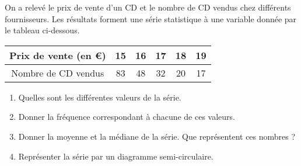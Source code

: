 \begin{exo}
On a relev\'e le prix de vente d'un CD et le nombre de CD vendus chez diff\'erents fournisseurs. Les r\'esultats forment une s\'erie statistique \`a une variable donn\'ee par le tableau ci-dessous.
\begin{center}
\begin{tabular}{|*{6}{c|}}\hline
Prix de vente (en \euro) & 15& 16&17&18&19\\ \hline
Nombre de CD vendus & 83&48&32&20&17 \\ \hline
\end{tabular}
\end{center}
\begin{enumerate}
	\item Quelles sont les diff\'erentes valeurs de la s\'erie.
	\item Donner la fr\'equence correspondant \`a chacune de ces valeurs.
	\item Donner la moyenne et la m\'ediane de la s\'erie. Que repr\'esentent ces nombres ?
	\item Repr\'esenter la s\'erie par un diagramme semi-circulaire.
\end{enumerate}
\end{exo}



